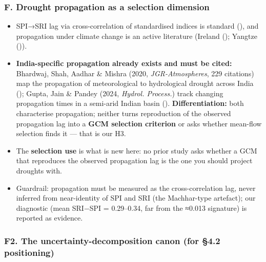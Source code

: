 \documentclass[
  english,
  11pt,
]{article}
\providecommand{\tightlist}{%
  \setlength{\itemsep}{0pt}\setlength{\parskip}{0pt}}
\begin{document}
\subsubsection{F. Drought propagation as a selection
dimension}\label{f.-drought-propagation-as-a-selection-dimension}

\begin{itemize}
\tightlist
\item
  SPI→SRI lag via cross-correlation of standardised indices is standard
  (), and
  propagation under climate change is an active literature (Ireland
  (); Yangtze
  ()).
\item
  \textbf{India-specific propagation already exists and must be cited:}
  Bhardwaj, Shah, Aadhar \& Mishra (2020, \emph{JGR-Atmospheres}, 229
  citations) map the propagation of meteorological to hydrological
  drought across India (); Gupta, Jain \& Pandey (2024, \emph{Hydrol. Process.})
  track changing propagation times in a semi-arid Indian basin
  ().
  \textbf{Differentiation:} both characterise propagation; neither turns
  reproduction of the observed propagation lag into a \textbf{GCM
  selection criterion} or asks whether mean-flow selection finds it ---
  that is our H3.
\item
  The \textbf{selection use} is what is new here: no prior study asks
  whether a GCM that reproduces the observed propagation lag is the one
  you should project droughts with.
\item
  Guardrail: propagation must be measured as the cross-correlation lag,
  never inferred from near-identity of SPI and SRI (the Machhar-type
  artefact); our diagnostic (mean \textbar SRI−SPI\textbar{} =
  0.29--0.34, far from the ≈0.013 signature) is reported as evidence.
\end{itemize}

\subsubsection{F2. The uncertainty-decomposition canon (for §4.2
positioning)}\label{f2.-the-uncertainty-decomposition-canon-for-4.2-positioning}
\end{document}
